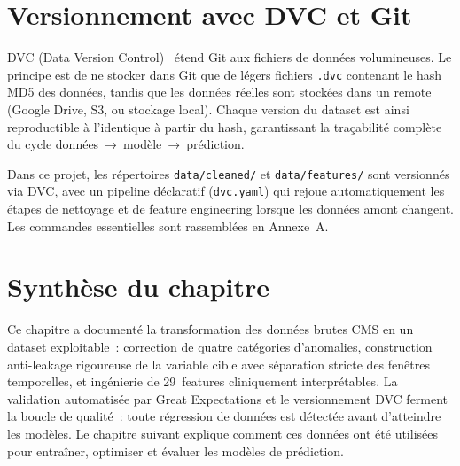 \section{Versionnement avec DVC et Git}

DVC (Data Version Control)~\cite{kupriianov2019dvc} étend Git aux fichiers de données
volumineuses. Le principe est de ne stocker dans Git que de légers fichiers
\texttt{.dvc} contenant le hash MD5 des données, tandis que les données réelles sont
stockées dans un remote (Google Drive, S3, ou stockage local). Chaque version du
dataset est ainsi reproductible à l'identique à partir du hash, garantissant
la traçabilité complète du cycle données~→~modèle~→~prédiction.

Dans ce projet, les répertoires \texttt{data/cleaned/} et \texttt{data/features/} sont
versionnés via DVC, avec un pipeline déclaratif (\texttt{dvc.yaml}) qui rejoue
automatiquement les étapes de nettoyage et de feature engineering lorsque les données
amont changent. Les commandes essentielles sont rassemblées en Annexe~A.

\section*{Synthèse du chapitre}

Ce chapitre a documenté la transformation des données brutes CMS en un dataset
exploitable~: correction de quatre catégories d'anomalies, construction anti-leakage
rigoureuse de la variable cible avec séparation stricte des fenêtres temporelles, et
ingénierie de 29~features cliniquement interprétables. La validation automatisée par
Great Expectations et le versionnement DVC ferment la boucle de qualité~: toute
régression de données est détectée avant d'atteindre les modèles. Le chapitre suivant
explique comment ces données ont été utilisées pour entraîner, optimiser et évaluer
les modèles de prédiction.

